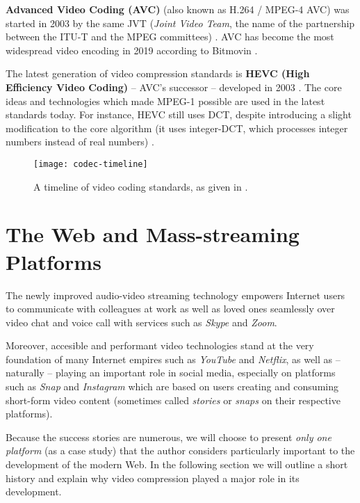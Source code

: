 \textbf{Advanced Video Coding (AVC)} (also known as H.264 / MPEG-4 AVC) was started in 2003 by the same JVT (\emph{Joint Video Team}, the name of the partnership between the ITU-T and the MPEG committees) \cite{wiki:Advanced_Video_Coding}.
AVC has become the most widespread video encoding in 2019 according to Bitmovin \cite{wiki:Video_coding_format}.

The latest generation of video compression standards is \textbf{HEVC (High Efficiency Video Coding)} -- AVC’s successor -- developed in 2003 \cite{wiki:Video_coding_format}.
The core ideas and technologies which made MPEG-1 possible are used in the latest standards today.
For instance, HEVC still uses DCT, despite introducing a slight modification to the core algorithm (it uses integer-DCT, which processes integer numbers instead of real numbers) \cite{wiki:High_Efficiency_Video_Coding}.

\begin{figure}[ht]
    \caption{A timeline of video coding standards, as given in \cite{ghanbari_2003}.}
    \centering
    \texttt{[image: codec-timeline]}
\end{figure}

\section{The Web and Mass-streaming Platforms}

The newly improved audio-video streaming technology empowers Internet users to communicate with colleagues at work as well as loved ones seamlessly over video chat and voice call with services such as \emph{Skype} and \emph{Zoom}.

Moreover, accesible and performant video technologies stand at the very foundation of many Internet empires such as \emph{YouTube} and \emph{Netflix}, as well as -- naturally -- playing an important role in social media, especially on platforms such as \emph{Snap} and \emph{Instagram} which are based on users creating and consuming short-form video content (sometimes called \emph{stories} or \emph{snaps} on their respective platforms).

Because the success stories are numerous, we will choose to present \emph{only one platform} (as a case study) that the author considers particularly important to the development of the modern Web.
In the following section we will outline a short history and explain why video compression played a major role in its development.

